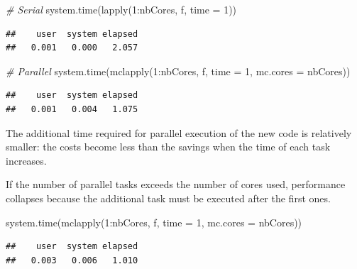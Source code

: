 \documentclass[
  12pt,
  american,
  a4paper,
  extrafontsizes,onecolumn,openright
  ]{memoir}
\newenvironment{Shaded}{\begin{snugshade}}{\end{snugshade}}
\newcommand{\AttributeTok}[1]{\textcolor[rgb]{0.77,0.63,0.00}{#1}}
\newcommand{\CommentTok}[1]{\textcolor[rgb]{0.56,0.35,0.01}{\textit{#1}}}
\newcommand{\DecValTok}[1]{\textcolor[rgb]{0.00,0.00,0.81}{#1}}
\newcommand{\FunctionTok}[1]{\textcolor[rgb]{0.00,0.00,0.00}{#1}}
\newcommand{\NormalTok}[1]{#1}
\newcommand{\SpecialCharTok}[1]{\textcolor[rgb]{0.00,0.00,0.00}{#1}}
\newlength{\rf}
\begin{document}
\scriptsize

\begin{Shaded}
\begin{Highlighting}[]
\CommentTok{\# Serial}
\FunctionTok{system.time}\NormalTok{(}\FunctionTok{lapply}\NormalTok{(}\DecValTok{1}\SpecialCharTok{:}\NormalTok{nbCores, f, }\AttributeTok{time =} \DecValTok{1}\NormalTok{))}
\end{Highlighting}
\end{Shaded}

\begin{verbatim}
##    user  system elapsed 
##   0.001   0.000   2.057
\end{verbatim}

\begin{Shaded}
\begin{Highlighting}[]
\CommentTok{\# Parallel}
\FunctionTok{system.time}\NormalTok{(}\FunctionTok{mclapply}\NormalTok{(}\DecValTok{1}\SpecialCharTok{:}\NormalTok{nbCores, f, }\AttributeTok{time =} \DecValTok{1}\NormalTok{, }\AttributeTok{mc.cores =}\NormalTok{ nbCores))}
\end{Highlighting}
\end{Shaded}

\begin{verbatim}
##    user  system elapsed 
##   0.001   0.004   1.075
\end{verbatim}

\normalsize

The additional time required for parallel execution of the new code is relatively smaller: the costs become less than the savings when the time of each task increases.

If the number of parallel tasks exceeds the number of cores used, performance collapses because the additional task must be executed after the first ones.

\scriptsize

\begin{Shaded}
\begin{Highlighting}[]
\FunctionTok{system.time}\NormalTok{(}\FunctionTok{mclapply}\NormalTok{(}\DecValTok{1}\SpecialCharTok{:}\NormalTok{nbCores, f, }\AttributeTok{time =} \DecValTok{1}\NormalTok{, }\AttributeTok{mc.cores =}\NormalTok{ nbCores))}
\end{Highlighting}
\end{Shaded}

\begin{verbatim}
##    user  system elapsed 
##   0.003   0.006   1.010
\end{verbatim}
\end{document}
